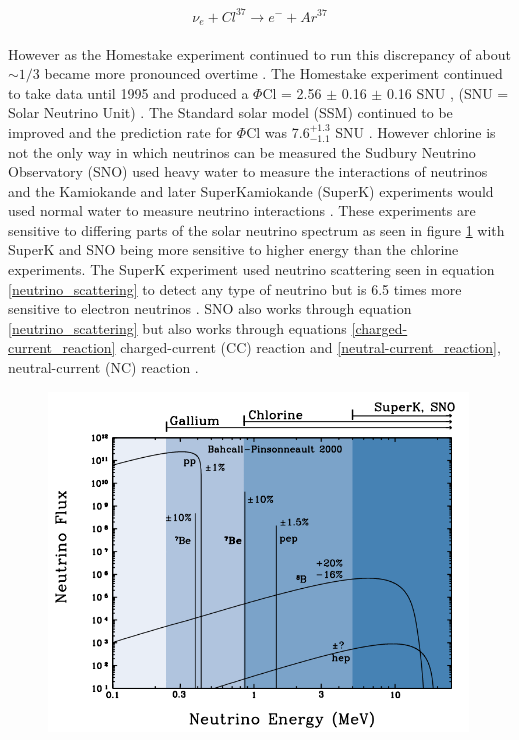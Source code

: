 \documentclass[12pt,a4paper]{article}
\begin{document}
\begin{equation}
    \nu_e + Cl^{37} \rightarrow  e^- + Ar^{37}
    \label{neutrino_chlorine_decay}
\end{equation}
\\However as the Homestake experiment continued to run this discrepancy of about $\sim 1/3$ became more pronounced overtime . The Homestake experiment continued to take data until 1995 and produced a $\Phi$Cl = 2.56 $\pm$ 0.16 $\pm$ 0.16 SNU , (SNU = Solar Neutrino Unit) \cite{Bellerive:2003rj}. The Standard solar model (SSM) continued to be improved and the prediction rate for $\Phi$Cl was 7.6$^{+ 1.3}_{-1.1}$ SNU \cite{Bellerive:2003rj}. However chlorine is not the only way in which neutrinos can be measured the Sudbury Neutrino Observatory (SNO) used heavy water to measure the interactions of neutrinos and the Kamiokande and later SuperKamiokande (SuperK) experiments would used normal water to measure neutrino interactions \cite{Bellerive:2003rj}. These experiments are sensitive to differing parts of the solar neutrino spectrum as seen in figure \ref{neutrino_emmision_graph} with SuperK and SNO being more sensitive to higher energy than the chlorine experiments. The SuperK experiment used neutrino scattering seen in equation \ref{neutrino_scattering} to detect any type of neutrino but is 6.5 times more sensitive to electron neutrinos \cite{griffiths2008book} \cite{griffiths2008neutrinoOscillations}. SNO also works through equation \ref{neutrino_scattering} but also works through equations \ref{charged-current_reaction} charged-current (CC) reaction  and \ref{neutral-current_reaction}, neutral-current (NC) reaction \cite{sno2001}\cite{Bellerive:2003rj} \cite{griffiths2008book} \cite{griffiths2008neutrinoOscillations}. 
\begin{figure}
 \centering
 \includegraphics[height=90mm]{neutrino_emmision_graph.png}
 \label{neutrino_emmision_graph}
\end{figure}
\end{document}
